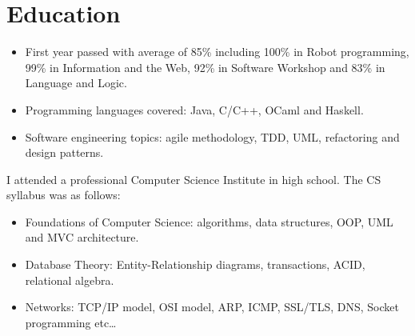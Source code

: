 \documentclass[11pt,a4paper,sans]{moderncv}        %
\begin{document}
\makecvtitle

\section{Education}
{
\begin{itemize}
\item First year passed with average of 85\% including 100\% in Robot programming, 99\% in Information and the Web, 92\% in Software Workshop and 83\% in Language and Logic.
\item Programming languages covered: Java, C/C++, OCaml and Haskell.
\item Software engineering topics: agile methodology, TDD, UML, refactoring and design patterns.
\end{itemize}
}  %
{
I attended a professional Computer Science Institute in high school. The CS syllabus was as follows:
\begin{itemize}
\item Foundations of Computer Science: algorithms, data structures, OOP, UML and MVC architecture.
\item Database Theory: Entity-Relationship diagrams, transactions, ACID, relational algebra.
\item Networks: TCP/IP model, OSI model, ARP, ICMP, SSL/TLS, DNS, Socket programming etc\dots
\end{itemize}
}
\end{document}
